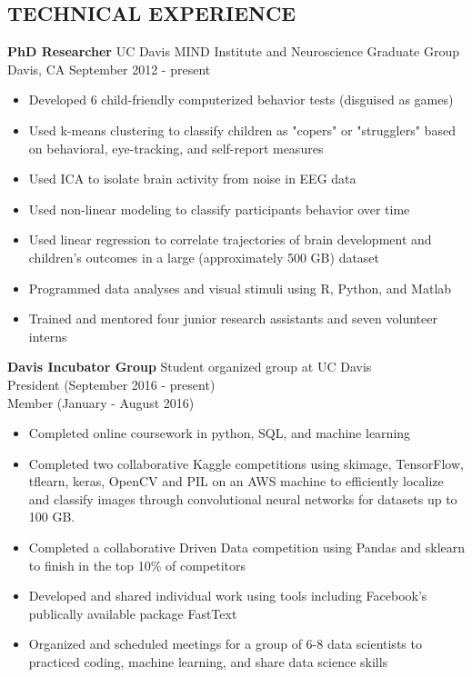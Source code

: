 \documentclass[line,margin,10pt]{res}
\begin{document}
\begin{resume}
\section{TECHNICAL EXPERIENCE}
\textbf{PhD Researcher} \hfill UC Davis MIND Institute and Neuroscience Graduate Group\\ 
Davis, CA \hfill September 2012 - present
\begin{itemize} \itemsep -2pt
\item Developed 6 child-friendly computerized behavior tests (disguised as games)
\item Used k-means clustering to classify children as "copers" or "strugglers" based on behavioral, eye-tracking, and self-report measures
\item Used ICA to isolate brain activity from noise in EEG data
\item Used non-linear modeling to classify participants behavior over time
\item Used linear regression to correlate trajectories of brain development and children's outcomes in a large (approximately 500 GB) dataset
\item Programmed data analyses and visual stimuli using R, Python, and Matlab
\item Trained and mentored four junior research assistants and seven volunteer interns
\end{itemize}

\textbf{Davis Incubator Group} \hfill Student organized group at UC Davis\\
President \hfill (September 2016 - present)\\
Member \hfill (January - August 2016) 
\begin{itemize} \itemsep -2pt
\item Completed online coursework in python, SQL, and machine learning
\item Completed two collaborative Kaggle competitions using skimage, TensorFlow, tflearn, keras, OpenCV and PIL on an AWS machine to efficiently localize and classify images through convolutional neural networks for datasets up to 100 GB.
\item Completed a collaborative Driven Data competition using Pandas and sklearn to finish in the top 10\% of competitors
\item Developed and shared individual work using tools including Facebook's publically available package FastText
\item Organized and scheduled meetings for a group of 6-8 data scientists to practiced coding, machine learning, and share data science skills
\end{itemize}


\end{resume}
\end{document}
